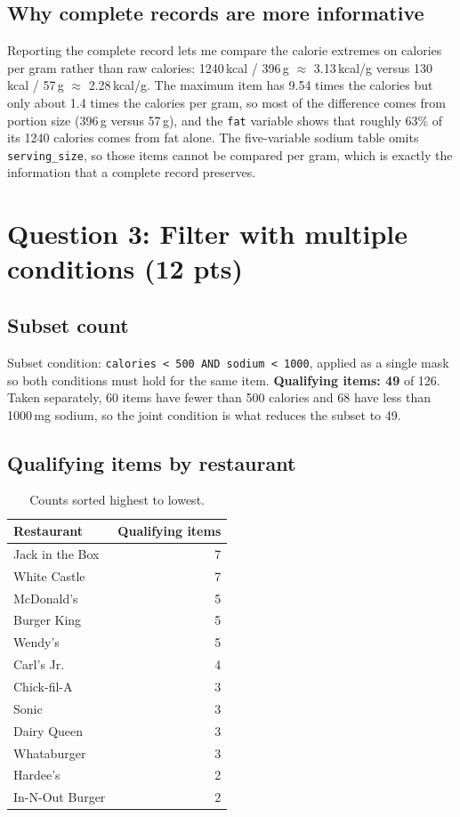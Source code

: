 \documentclass[11pt]{article}
\newcommand{\question}[2]{%
  \section*{\color{headblue}#1 \hfill \normalfont\small(#2)}}
\begin{document}
\subsection*{Why complete records are more informative}
Reporting the complete record lets me compare the calorie extremes on calories per gram
rather than raw calories: 1240\,kcal / 396\,g $\approx$ 3.13\,kcal/g versus 130\,kcal /
57\,g $\approx$ 2.28\,kcal/g. The maximum item has 9.54 times the calories but only about
1.4 times the calories per gram, so most of the difference comes from portion size
(396\,g versus 57\,g), and the \texttt{fat} variable shows that roughly 63\% of its 1240
calories comes from fat alone. The five-variable sodium table omits \texttt{serving\_size},
so those items cannot be compared per gram, which is exactly the information that a
complete record preserves.

\clearpage
\question{Question 3: Filter with multiple conditions}{12 pts}

\subsection*{Subset count}

Subset condition: \texttt{calories < 500 AND sodium < 1000}, applied as a single mask so
both conditions must hold for the same item. \textbf{Qualifying items: 49} of 126.
Taken separately, 60 items have fewer than 500 calories and 68 have less than 1000\,mg
sodium, so the joint condition is what reduces the subset to 49.

\subsection*{Qualifying items by restaurant}

\begin{table}[H]\centering\small
\begin{tabular}{lr}
\toprule
Restaurant & Qualifying items \\
\midrule
Jack in the Box   & 7 \\
White Castle      & 7 \\
McDonald's        & 5 \\
Burger King       & 5 \\
Wendy's           & 5 \\
Carl's Jr.        & 4 \\
Chick-fil-A       & 3 \\
Sonic             & 3 \\
Dairy Queen       & 3 \\
Whataburger       & 3 \\
Hardee's          & 2 \\
In-N-Out Burger   & 2 \\
\bottomrule
\end{tabular}
\caption{Counts sorted highest to lowest.}
\end{table}
\end{document}
